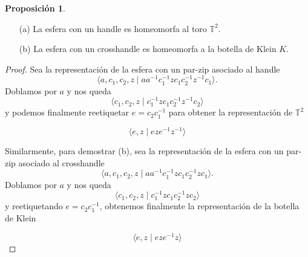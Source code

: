 \documentclass[10pt]{report}
\newcommand{\Toro}{\mathbb{T}^2}
\theoremstyle{definition}
\newtheorem{prop}[defin]{Proposición}
\begin{document}
\begin{prop}\label{prop:handletoro_crosshandleklein}
\begin{itemize}

\item[(a)] La esfera con un handle es homeomorfa al toro $\Toro$.
\item [(b)] La esfera con un crosshandle es homeomorfa a la botella de Klein $K$.

\end{itemize}
\end{prop}
\begin{proof}
Sea la representación de la esfera con un par-zip asociado al handle $$\langle a,c_1,c_2,z\mid aa^{-1} c_1^{-1}zc_1c_2^{-1}z^{-1}c_1\rangle.$$ Doblamos por $a$ y nos queda
\[
\langle c_1,c_2,z\mid c_1^{-1}zc_1c_2^{-1}z^{-1}c_2\rangle
\]
y podemos finalmente reetiquetar $e=c_2c_1^{-1}$ para obtener la representación de $\Toro$ 

\[
\langle e,z\mid eze^{-1}z^{-1}\rangle
\]

Similarmente, para demostrar (b), sea la representación de la esfera con un par-zip asociado al crosshandle $$\langle a,c_1,c_2,z\mid aa^{-1} c_1^{-1}zc_1c_2^{-1}zc_1\rangle.$$ Doblamos por $a$ y nos queda
\[
\langle c_1,c_2,z\mid c_1^{-1}zc_1c_2^{-1}zc_2\rangle
\]
y reetiquetando $e=c_2c_1^{-1}$, obtenemos finalmente la representación de la botella de Klein

\[
\langle e,z\mid eze^{-1}z\rangle
\]


\end{proof}
\end{document}

